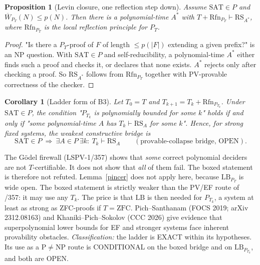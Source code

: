 \documentclass[11pt]{article}
\newtheorem{proposition}[lemma]{Proposition}
\newtheorem{corollary}[lemma]{Corollary}
\newcommand{\SAT}{\mathrm{SAT}}
\begin{document}
\begin{proposition}[Levin closure, one reflection step down]\label{down}
Assume $\SAT\in P$ and $\overline W_{P_T}(N)\le p(N)$. Then there is a polynomial-time $A^\ast$ with
$T+\mathrm{Rfn}_{P_T}\vdash\mathrm{RS}_{A^\ast}$, where $\mathrm{Rfn}_{P_T}$ is the local reflection principle for $P_T$.
\end{proposition}
\begin{proof}
"Is there a $P_T$-proof of $F$ of length $\le p(|F|)$ extending a given prefix?" is an NP question. With $\SAT\in P$ and self-reducibility, a polynomial-time $A^\ast$ either finds such a proof and checks it, or declares that none exists. $A^\ast$ rejects only after checking a proof. So $\mathrm{RS}_{A^\ast}$ follows from $\mathrm{Rfn}_{P_T}$ together with PV-provable correctness of the checker.
\end{proof}

\begin{corollary}[Ladder form of B3]\label{ladder}
Let $T_0=T$ and $T_{k+1}=T_k+\mathrm{Rfn}_{P_{T_k}}$. Under $\SAT\in P$, the condition
"$P_{T_k}$ is polynomially bounded for some $k$" holds if and only if "some polynomial-time $A$ has
$T_k\vdash\mathrm{RS}_A$ for some $k$". Hence, for strong fixed systems, the weakest constructive bridge is
\[
\boxed{\SAT\in P\ \Longrightarrow\ \exists A\in P\ \exists k:\ T_k\vdash\mathrm{RS}_A}
\qquad(\text{provable-collapse bridge, OPEN}).
\]
\end{corollary}
\noindent The Gödel firewall (LSPV-1/357) shows that \emph{some} correct polynomial deciders are not
$T$-certifiable. It does not show that \emph{all} of them fail. The boxed statement is therefore not refuted.
Lemma~\ref{pincer} does not apply here, because $\mathrm{LB}_{P_T}$ is wide open. The boxed statement
is strictly weaker than the PV/EF route of /357: it may use any $T_k$. The price is that $\mathrm{LB}$ is then
needed for $P_{T_k}$, a system at least as strong as ZFC-proofs if $T=\mathrm{ZFC}$.
Pich--Santhanam (FOCS 2019; arXiv 2312.08163) and Khaniki--Pich--Sokolov (CCC 2026) give
evidence that superpolynomial lower bounds for EF and stronger systems face inherent provability obstacles.
\emph{Classification:} the ladder is EXACT within its hypotheses. Its use as a P$\ne$NP route is CONDITIONAL on
the boxed bridge and on $\mathrm{LB}_{P_{T_k}}$, and both are OPEN.
\end{document}
